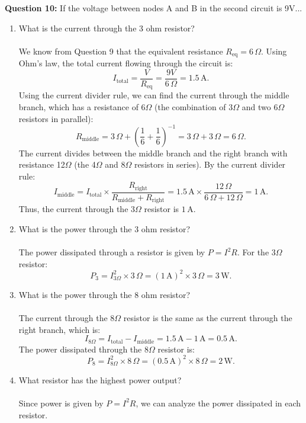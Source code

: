 \documentclass{article}
\begin{document}
\textbf{Question 10:} If the voltage between nodes A and B in the second circuit is 9V...
\begin{enumerate}
\item What is the current through the 3 ohm resistor?
\\
\\
We know from Question 9 that the equivalent resistance \( R_{\text{eq}} = 6 \, \Omega \). Using Ohm's law, the total current flowing through the circuit is:
    \[
    I_{\text{total}} = \frac{V}{R_{\text{eq}}} = \frac{9V}{6 \, \Omega} = 1.5 \, \text{A}.
    \]
    Using the current divider rule, we can find the current through the middle branch, which has a resistance of 6\(\Omega\) (the combination of 3\(\Omega\) and two 6\(\Omega\) resistors in parallel):
    \[
    R_{\text{middle}} = 3 \, \Omega + \left( \frac{1}{6} + \frac{1}{6} \right)^{-1} = 3 \, \Omega + 3 \, \Omega = 6 \, \Omega.
    \]
    The current divides between the middle branch and the right branch with resistance 12\(\Omega\) (the 4\(\Omega\) and 8\(\Omega\) resistors in series). By the current divider rule:
    \[
    I_{\text{middle}} = I_{\text{total}} \times \frac{R_{\text{right}}}{R_{\text{middle}} + R_{\text{right}}} = 1.5 \, \text{A} \times \frac{12 \, \Omega}{6 \, \Omega + 12 \, \Omega} = 1 \, \text{A}.
    \]
    Thus, the current through the 3\(\Omega\) resistor is \( 1 \, \text{A} \).
\\
\item What is the power through the 3 ohm resistor?
\\
\\
The power dissipated through a resistor is given by \( P = I^2 R \). For the 3\(\Omega\) resistor:
    \[
    P_3 = I_{\text{3}\Omega}^2 \times 3 \, \Omega = (1 \, \text{A})^2 \times 3 \, \Omega = 3 \, \text{W}.
    \]


\item What is the power through the 8 ohm resistor?
\\
\\
The current through the 8\(\Omega\) resistor is the same as the current through the right branch, which is:
    \[
    I_{\text{8}\Omega} = I_{\text{total}} - I_{\text{middle}} = 1.5 \, \text{A} - 1 \, \text{A} = 0.5 \, \text{A}.
    \]
    The power dissipated through the 8\(\Omega\) resistor is:
    \[
    P_8 = I_{\text{8}\Omega}^2 \times 8 \, \Omega = (0.5 \, \text{A})^2 \times 8 \, \Omega = 2 \, \text{W}.
    \]

\item What resistor has the highest power output?
\\
\\
Since power is given by \( P = I^2 R \), we can analyze the power dissipated in each resistor.


\end{enumerate}
\end{document}
